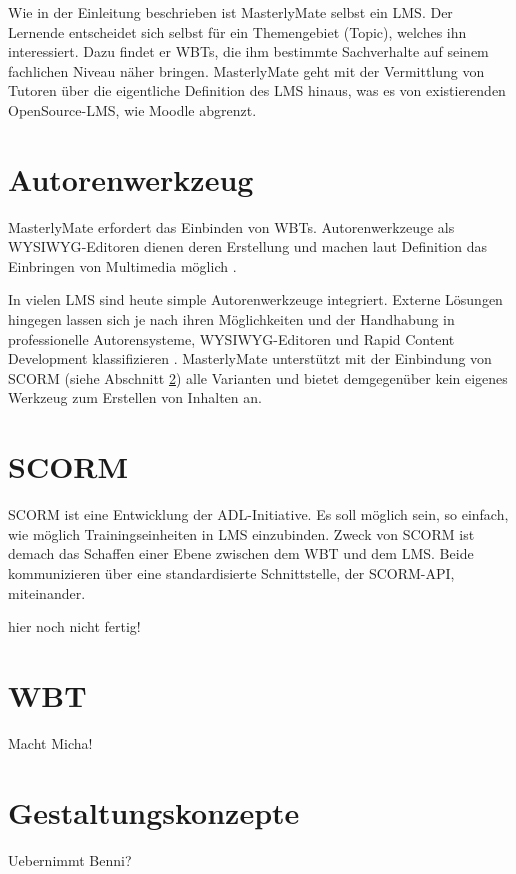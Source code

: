 Wie in der Einleitung beschrieben ist MasterlyMate selbst ein LMS. Der Lernende
entscheidet sich selbst für ein Themengebiet (Topic), welches ihn interessiert.
Dazu findet er WBTs, die ihm bestimmte Sachverhalte auf seinem fachlichen Niveau
näher bringen. MasterlyMate geht mit der Vermittlung von Tutoren über die
eigentliche Definition des LMS hinaus, was es von existierenden OpenSource-LMS,
wie Moodle abgrenzt.

\section{Autorenwerkzeug}
MasterlyMate erfordert das Einbinden von WBTs. Autorenwerkzeuge als
\ac{WYSIWYG}-Editoren dienen deren Erstellung und machen laut Definition das
Einbringen von Multimedia möglich \cite{niegemann:2004}. 

In vielen LMS sind heute simple Autorenwerkzeuge integriert. Externe Lösungen
hingegen lassen sich je nach ihren Möglichkeiten und der Handhabung in
professionelle Autorensysteme, WYSIWYG-Editoren und Rapid Content Development
klassifizieren \cite{niegemann:2004}. MasterlyMate unterstützt mit der
Einbindung von SCORM (siehe Abschnitt \ref{ref:scorm}) alle Varianten und bietet
demgegenüber kein eigenes Werkzeug zum Erstellen von Inhalten an.

\section{SCORM}\label{ref:scorm}
\ac{SCORM} ist eine Entwicklung der \ac{ADL}-Initiative. Es soll möglich sein,
so einfach, wie möglich Trainingseinheiten in LMS einzubinden. Zweck von SCORM
ist demach das Schaffen einer Ebene zwischen dem WBT und dem LMS. Beide
kommunizieren über eine standardisierte Schnittstelle, der SCORM-API,
miteinander.
\begin{k}
hier noch nicht fertig!
\end{k}

\section{WBT}
\begin{k}
Macht Micha!
\end{k}

\section{Gestaltungskonzepte}
\begin{k}
Uebernimmt Benni?
\end{k}